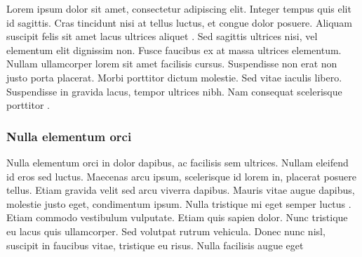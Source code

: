 Lorem ipsum dolor sit amet, consectetur adipiscing elit. Integer tempus quis elit id sagittis. Cras tincidunt nisi at tellus luctus, et congue dolor posuere. Aliquam suscipit felis sit amet lacus ultrices aliquet . Sed sagittis ultrices nisi, vel elementum elit dignissim non. Fusce faucibus ex at massa ultrices elementum. Nullam ullamcorper lorem sit amet facilisis cursus. Suspendisse non erat non justo porta placerat. Morbi porttitor dictum molestie. Sed vitae iaculis libero. Suspendisse in gravida lacus, tempor ultrices nibh. Nam consequat scelerisque porttitor \cite{itu-r-reg-articles, ecss-e-st-50-05c}.

\subsubsection{Nulla elementum orci}

Nulla elementum orci in dolor dapibus, ac facilisis sem ultrices. Nullam eleifend id eros sed luctus. Maecenas arcu ipsum, scelerisque id lorem in, placerat posuere tellus. Etiam gravida velit sed arcu viverra dapibus. Mauris vitae augue dapibus, molestie justo eget, condimentum ipsum. Nulla tristique mi eget semper luctus \cite{an1368-analog-ferrite}. Etiam commodo vestibulum vulputate. Etiam quis sapien dolor. Nunc tristique eu lacus quis ullamcorper. Sed volutpat rutrum vehicula. Donec nunc nisl, suscipit in faucibus vitae, tristique eu risus. Nulla facilisis augue eget


